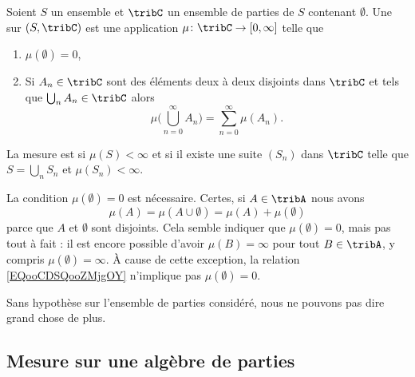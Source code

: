 \begin{definition}       \label{DefWUPHooEklLmR}
	Soient \( S\) un ensemble et \( \tribC\) un ensemble de parties de \( S\) contenant \( \emptyset\). Une  sur \( (S,\tribC)\) est une application \( \mu\colon \tribC\to \mathopen[ 0 , \infty \mathclose]\) telle que
	\begin{enumerate}
		\item
		      \( \mu(\emptyset)=0\),
		\item
		      Si \( A_n\in\tribC\) sont des éléments deux à deux disjoints dans \( \tribC\) et tels que \( \bigcup_nA_n\in\tribC\) alors
		      \begin{equation}
			      \mu\big( \bigcup_{n=0}^{\infty}A_n \big)=\sum_{n=0}^{\infty}\mu(A_n).
		      \end{equation}
	\end{enumerate}

	La mesure est  si \( \mu(S)<\infty\) et  si il existe une suite \( (S_n)\) dans \( \tribC\) telle que \( S=\bigcup_nS_n\) et \( \mu(S_n)<\infty\).
\end{definition}

\begin{remark}
	La condition \( \mu(\emptyset)=0\) est nécessaire. Certes, si \( A\in \tribA\) nous avons
	\begin{equation}        \label{EQooCDSQooZMjgOY}
		\mu(A)=\mu(A\cup \emptyset)=\mu(A)+\mu(\emptyset)
	\end{equation}
	parce que \( A\) et \( \emptyset\) sont disjoints. Cela semble indiquer que \( \mu(\emptyset)=0\), mais pas tout à fait : il est encore possible d'avoir \( \mu(B)=\infty\) pour tout \( B\in\tribA\), y compris \( \mu(\emptyset)=\infty\). À cause de cette exception, la relation \eqref{EQooCDSQooZMjgOY} n'implique pas \( \mu(\emptyset)=0\).
\end{remark}

Sans hypothèse sur l'ensemble de parties considéré, nous ne pouvons pas dire grand chose de plus.

\subsection{Mesure sur une algèbre de parties}

